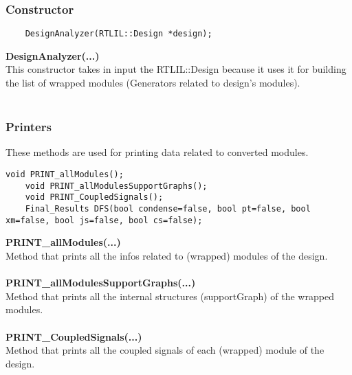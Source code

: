 \documentclass{article}
\begin{document}
\subsubsection{Constructor}

\begin{mdframed}[hidealllines=true, backgroundcolor=magenta!10]
	\begin{lstlisting}
	DesignAnalyzer(RTLIL::Design *design);
	\end{lstlisting}
\end{mdframed}

\textbf{DesignAnalyzer(...)}\\
This constructor takes in input the RTLIL::Design because it uses it for building the list of wrapped modules (Generators related to design's modules).\\\\

\subsubsection{Printers}

These methods are used for printing data related to converted modules.\\

\begin{mdframed}[hidealllines=true, backgroundcolor=magenta!10]
	\begin{lstlisting}[basicstyle=\tiny]
	void PRINT_allModules();
	void PRINT_allModulesSupportGraphs();
	void PRINT_CoupledSignals();
	Final_Results DFS(bool condense=false, bool pt=false, bool xm=false, bool js=false, bool cs=false);
	\end{lstlisting}
\end{mdframed}

\textbf{PRINT\_allModules(...)}\\
Method that prints all the infos related to (wrapped) modules of the design.\\\\

\textbf{PRINT\_allModulesSupportGraphs(...)}\\
Method that prints all the internal structures (supportGraph) of the wrapped modules.\\\\

\textbf{PRINT\_CoupledSignals(...)}\\
Method that prints all the coupled signals of each (wrapped) module of the design.\\\\
\end{document}
